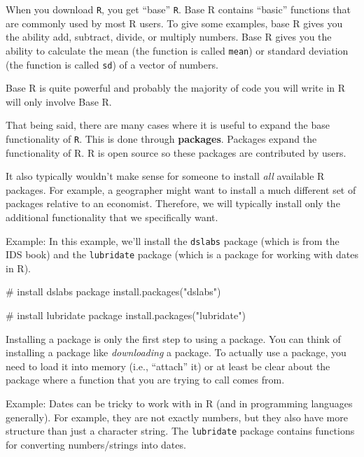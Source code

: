 \documentclass[
  letterpaper,
  DIV=11,
  numbers=noendperiod]{scrreprt}
\newenvironment{Shaded}{\begin{snugshade}}{\end{snugshade}}
\newcommand{\CommentTok}[1]{\textcolor[rgb]{0.37,0.37,0.37}{#1}}
\newcommand{\FunctionTok}[1]{\textcolor[rgb]{0.28,0.35,0.67}{#1}}
\newcommand{\NormalTok}[1]{\textcolor[rgb]{0.00,0.23,0.31}{#1}}
\newcommand{\StringTok}[1]{\textcolor[rgb]{0.13,0.47,0.30}{#1}}
\begin{document}
When you download \texttt{R}, you get ``base'' \texttt{R}. Base R
contains ``basic'' functions that are commonly used by most R users. To
give some examples, base R gives you the ability add, subtract, divide,
or multiply numbers. Base R gives you the ability to calculate the mean
(the function is called \texttt{mean}) or standard deviation (the
function is called \texttt{sd}) of a vector of numbers.

Base R is quite powerful and probably the majority of code you will
write in R will only involve Base R.

That being said, there are many cases where it is useful to expand the
base functionality of \texttt{R}. This is done through
\textbf{packages}. Packages expand the functionality of R. R is open
source so these packages are contributed by users.

It also typically wouldn't make sense for someone to install \emph{all}
available R packages. For example, a geographer might want to install a
much different set of packages relative to an economist. Therefore, we
will typically install only the additional functionality that we
specifically want.

{Example: }In this example, we'll install the \texttt{dslabs} package
(which is from the IDS book) and the \texttt{lubridate} package (which
is a package for working with dates in R).

\begin{Shaded}
\begin{Highlighting}[]
\CommentTok{\# install dslabs package}
\FunctionTok{install.packages}\NormalTok{(}\StringTok{"dslabs"}\NormalTok{)}

\CommentTok{\# install lubridate package}
\FunctionTok{install.packages}\NormalTok{(}\StringTok{"lubridate"}\NormalTok{)}
\end{Highlighting}
\end{Shaded}

Installing a package is only the first step to using a package. You can
think of installing a package like \emph{downloading} a package. To
actually use a package, you need to load it into memory (i.e.,
``attach'' it) or at least be clear about the package where a function
that you are trying to call comes from.

{Example: } Dates can be tricky to work with in R (and in programming
languages generally). For example, they are not exactly numbers, but
they also have more structure than just a character string. The
\texttt{lubridate} package contains functions for converting
numbers/strings into dates.
\end{document}
